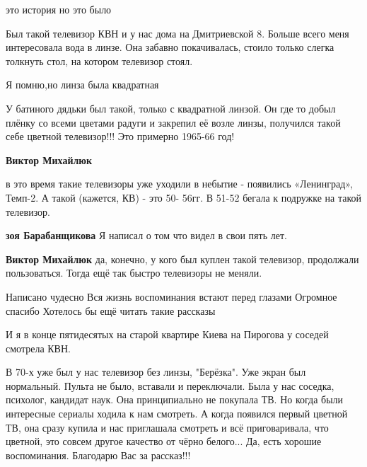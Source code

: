 \begin{itemize}
это история но это было


Был такой телевизор КВН и у нас дома на Дмитриевской 8. Больше всего меня
интересовала вода в линзе. Она забавно покачивалась, стоило только слегка
толкнуть стол, на котором телевизор стоял.

Я помню,но линза была квадратная


У батиного дядьки был такой, только с квадратной линзой. Он где то добыл плёнку
со всеми цветами радуги и закрепил её возле линзы, получился такой себе цветной
телевизор!!! Это примерно 1965-66 год!

\begin{itemize} %
\textbf{Виктор Михайлюк} 

в это время такие телевизоры уже уходили в небытие - появились «Ленинград»,
Темп-2. А такой (кажется, КВ) - это 50- 56гг. В 51-52 бегала к подружке на
такой телевизор.

\begin{itemize} %
\textbf{зоя Барабанщикова} Я написал о том что видел в свои пять лет.

\textbf{Виктор Михайлюк} да, конечно, у кого был куплен такой телевизор, продолжали пользоваться. Тогда ещё так быстро телевизоры не меняли.
\end{itemize} %

\end{itemize} %

Написано чудесно Вся жизнь воспоминания встают перед глазами Огромное спасибо Хотелось бы ещё читать такие рассказы

И я в конце пятидесятых на старой квартире Киева на Пирогова у соседей смотрела КВН.


В 70-х уже был у нас телевизор без линзы, "Берёзка". Уже экран был нормальный.
Пульта не было, вставали и переключали. Была у нас соседка, психолог, кандидат
наук. Она принципиально не покупала ТВ. Но когда были интересные сериалы ходила
к нам смотреть. А когда появился первый цветной ТВ, она сразу купила и нас
приглашала смотреть и всё приговаривала, что цветной, это совсем другое
качество от чёрно белого... Да, есть хорошие воспоминания. Благодарю Вас за
рассказ!!!


\end{itemize}
